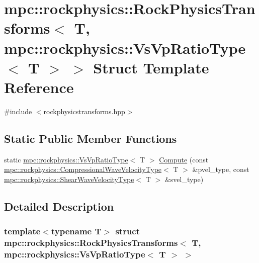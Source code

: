 \hypertarget{structmpc_1_1rockphysics_1_1_rock_physics_transforms_3_01_t_00_01mpc_1_1rockphysics_1_1_vs_vp_ratio_type_3_01_t_01_4_01_4}{}\section{mpc\+:\+:rockphysics\+:\+:Rock\+Physics\+Transforms$<$ T, mpc\+:\+:rockphysics\+:\+:Vs\+Vp\+Ratio\+Type$<$ T $>$ $>$ Struct Template Reference}
\label{structmpc_1_1rockphysics_1_1_rock_physics_transforms_3_01_t_00_01mpc_1_1rockphysics_1_1_vs_vp_ratio_type_3_01_t_01_4_01_4}


{\ttfamily \#include $<$rockphysicstransforms.\+hpp$>$}

\subsection*{Static Public Member Functions}
\begin{DoxyCompactItemize}
\item 
static \mbox{\hyperlink{structmpc_1_1rockphysics_1_1_vs_vp_ratio_type}{mpc\+::rockphysics\+::\+Vs\+Vp\+Ratio\+Type}}$<$ T $>$ \mbox{\hyperlink{structmpc_1_1rockphysics_1_1_rock_physics_transforms_3_01_t_00_01mpc_1_1rockphysics_1_1_vs_vp_ratio_type_3_01_t_01_4_01_4_a01ef06c639283c426ee380cf34c05813}{Compute}} (const \mbox{\hyperlink{structmpc_1_1rockphysics_1_1_compressional_wave_velocity_type}{mpc\+::rockphysics\+::\+Compressional\+Wave\+Velocity\+Type}}$<$ T $>$ \&pvel\+\_\+type, const \mbox{\hyperlink{structmpc_1_1rockphysics_1_1_shear_wave_velocity_type}{mpc\+::rockphysics\+::\+Shear\+Wave\+Velocity\+Type}}$<$ T $>$ \&svel\+\_\+type)
\end{DoxyCompactItemize}


\subsection{Detailed Description}
\subsubsection*{template$<$typename T$>$\newline
struct mpc\+::rockphysics\+::\+Rock\+Physics\+Transforms$<$ T, mpc\+::rockphysics\+::\+Vs\+Vp\+Ratio\+Type$<$ T $>$ $>$}



